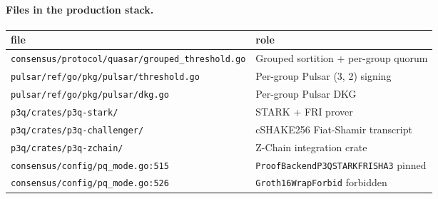 \paragraph{Files in the production stack.}
\begin{center}\small
\begin{tabular}{l l}
\toprule
file & role \\
\midrule
\texttt{consensus/protocol/quasar/grouped\_threshold.go} & Grouped sortition + per-group quorum \\
\texttt{pulsar/ref/go/pkg/pulsar/threshold.go} & Per-group Pulsar (3, 2) signing \\
\texttt{pulsar/ref/go/pkg/pulsar/dkg.go} & Per-group Pulsar DKG \\
\texttt{p3q/crates/p3q-stark/} & STARK + FRI prover \\
\texttt{p3q/crates/p3q-challenger/} & cSHAKE256 Fiat-Shamir transcript \\
\texttt{p3q/crates/p3q-zchain/} & Z-Chain integration crate \\
\texttt{consensus/config/pq\_mode.go:515} & \texttt{ProofBackendP3QSTARKFRISHA3} pinned \\
\texttt{consensus/config/pq\_mode.go:526} & \texttt{Groth16WrapForbid} forbidden \\
\bottomrule
\end{tabular}
\end{center}
